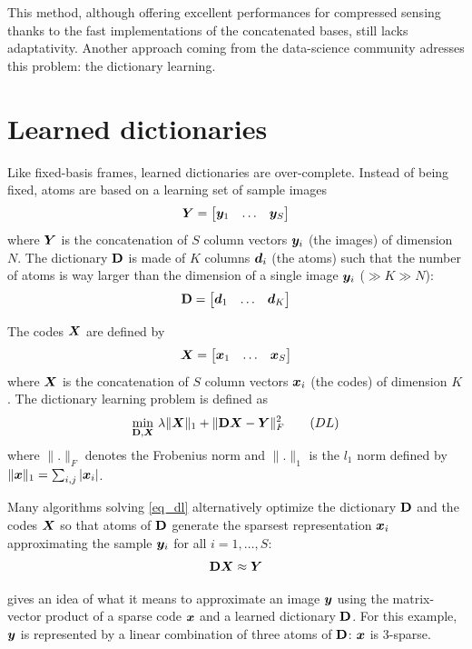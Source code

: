 This method, although offering excellent performances for compressed sensing thanks to the fast implementations of the concatenated bases, still lacks adaptativity. Another approach coming from the data-science community adresses this problem: the dictionary learning.

\section{Learned dictionaries}

Like fixed-basis frames, learned dictionaries are over-complete. Instead of being fixed, atoms are based on a learning set of sample images
$$\bm{Y} = \begin{bmatrix} \bm{y}_1 & \dots & \bm{y}_S \end{bmatrix}$$
where $\bm{Y}$ is the concatenation of $S$ column vectors $\bm{y}_i$ (the images) of dimension $N$. The dictionary $\mathbf{D}$ is made of $K$ columns $\bm{d}_i$ (the atoms) such that the number of atoms is way larger than the dimension of a single image $\bm{y}_i$ ($ \gg K \gg N$):
$$\mathbf{D} = \begin{bmatrix} \bm{d}_1 & \dots & \bm{d}_K \end{bmatrix}$$

The codes $\bm{X}$ are defined by
$$\bm{X} = \begin{bmatrix} \bm{x}_1 & \dots & \bm{x}_S \end{bmatrix}$$
where $\bm{X}$ is the concatenation of $S$ column vectors $\bm{x}_i$ (the codes) of dimension $K$. The dictionary learning problem is defined as
\begin{align}
\underset{\mathbf{D},\bm{X}}{\min}~ \lambda \lVert \bm{X} \rVert_1 + \lVert \mathbf{D}\bm{X}-\bm{Y} \rVert^2_F \tag{$DL$} \label{eq_dl}
\end{align}
where $\lVert . \rVert_F$ denotes the Frobenius norm and $\lVert . \rVert_1$ is the $l_1$ norm defined by  $\lVert \bm{x} \rVert_1 = \sum_{i,j} |\bm{x}_i|$.

Many algorithms solving \eqref{eq_dl} alternatively optimize the dictionary $\mathbf{D}$ and the codes $\bm{X}$ so that atoms of $\mathbf{D}$ generate the sparsest representation $\bm{x}_i$ approximating the sample $\bm{y}_i$ for all $i = 1,\dots,S$:
$$\mathbf{D}\bm{X} \approx \bm{Y}$$

 gives an idea of what it means to approximate an image $\bm{y}$ using the matrix-vector product of a sparse code $\bm{x}$ and a learned dictionary $\mathbf{D}$. For this example, $\bm{y}$ is represented by a linear combination of three atoms of $\mathbf{D}$: $\bm{x}$ is 3-sparse.

